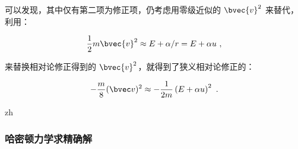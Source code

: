 可以发现，其中仅有第二项为修正项，仍考虑用零级近似的 $\bvec{v}^2$ 来替代，利用：

$$\frac{1}{2} m \bvec{v}^2 \approx E + \alpha / r = E + \alpha u ~,$$

来替换相对论修正得到的 $\bvec{v}^2$，就得到了狭义相对论修正的：

\begin{equation}
-\frac{m}{8} (\bvec v)^2 \approx - \frac{1}{2m} \left(E + \alpha u\right)^2 ~.
\end{equation}

zh

\subsubsection{哈密顿力学求精确解}
